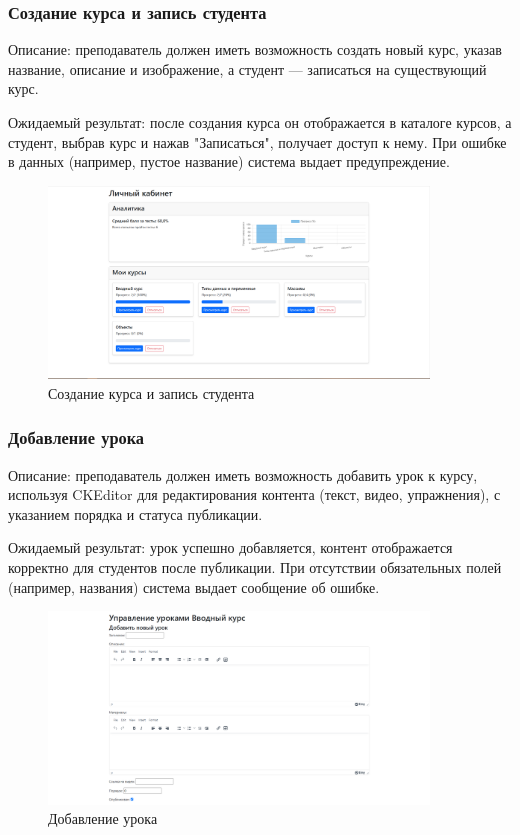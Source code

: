 \subsubsection{Создание курса и запись студента}
	
Описание: преподаватель должен иметь возможность создать новый курс, указав название, описание и изображение, а студент — записаться на существующий курс.
	
Ожидаемый результат: после создания курса он отображается в каталоге курсов, а студент, выбрав курс и нажав "Записаться", получает доступ к нему. При ошибке в данных (например, пустое название) система выдает предупреждение.
	
\begin{figure}[ht]
		\centering
		\includegraphics[width=0.9\textwidth]{images/запись} 
		\caption{Создание курса и запись студента}
		\label{enroll:image}
\end{figure}
	
\subsubsection{Добавление урока}
	
Описание: преподаватель должен иметь возможность добавить урок к курсу, используя CKEditor для редактирования контента (текст, видео, упражнения), с указанием порядка и статуса публикации.
	
Ожидаемый результат: урок успешно добавляется, контент отображается корректно для студентов после публикации. При отсутствии обязательных полей (например, названия) система выдает сообщение об ошибке.
	
	\begin{figure}[ht]
		\centering
		\includegraphics[width=0.9\textwidth]{images/урокдобавить} 
		\caption{Добавление урока}
		\label{urok:image}
	\end{figure}
\newpage
